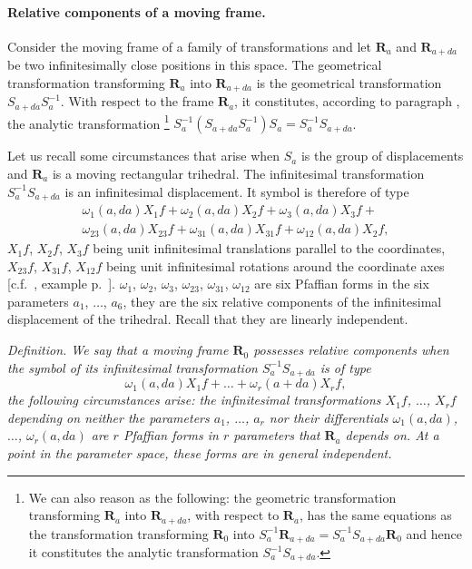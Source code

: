 \paragraph{Relative components of a moving frame.}
\label{sec:70}
Consider the moving frame of a family of transformations and let $\mathbf{R}_{a}$ and $\mathbf{R}_{a+da}$ be two infinitesimally close positions in this space. The geometrical transformation transforming $\mathbf{R}_{a}$ into $\mathbf{R}_{a+da}$ is the geometrical transformation $S_{a+da}S^{-1}_{a}$. With respect to the frame $\mathbf{R}_{a}$, it constitutes, according to paragraph , the analytic transformation \footnote{We can also reason as the following: the geometric transformation transforming $\mathbf{R}_{a}$ into $\mathbf{R}_{a+da}$, with respect to $\mathbf{R}_{a}$, has the same equations as the transformation transforming $\mathbf{R}_{0}$ into $S_{a}^{-1}\mathbf{R}_{a+da}=S_{a}^{-1}S_{a+da}\mathbf{R}_{0}$ and hence it constitutes the analytic transformation $S_{a}^{-1}S_{a+da}$.} $S_{a}^{-1}(S_{a+da}S_{a}^{-1})S_{a}=S_{a}^{-1}S_{a+da}$.

Let us recall some circumstances that arise when $S_{a}$ is the group of displacements and $\mathbf{R}_{a}$ is a moving rectangular trihedral. The infinitesimal transformation $S_{a}^{-1}S_{a+da}$ is an infinitesimal displacement. It symbol is therefore of type
\begin{equation}
  \label{eq:5.11}
  \begin{multlined}    
    \omega_{1}(a,da)X_{1}f+\omega_{2}(a,da)X_{2}f+\omega_{3}(a,da)X_{3}f+\\
    \omega_{23}(a,da)X_{23}f+\omega_{31}(a,da)X_{31}f+\omega_{12}(a,da)X_{2}f,
  \end{multlined}
\end{equation}
$X_{1}f$, $X_{2}f$, $X_{3}f$ being unit infinitesimal translations parallel to the coordinates, $X_{23}f$, $X_{31}f$, $X_{12}f$ being unit infinitesimal rotations around the coordinate axes [c.f.~, example p.~\pageref{sec:68}]. $\omega_{1}$, $\omega_{2}$, $\omega_{3}$, $\omega_{23}$, $\omega_{31}$, $\omega_{12}$ are six Pfaffian forms in the six parameters $a_{1}$, $\dots$, $a_{6}$, they are the six relative components of the infinitesimal displacement of the trihedral. Recall that they are linearly independent.

\somespace

\emph{Definition. We say that a moving frame $\mathbf{R}_{0}$ possesses relative components when the symbol of its infinitesimal transformation $S_{a}^{-1}S_{a+da}$ is of type
  \begin{equation}
    \label{eq:5.12}
    \omega_{1}(a,da)X_{1}f+\dots+\omega_{r}(a+da)X_{r}f,
  \end{equation}
the following circumstances arise: the infinitesimal transformations $X_{1}f$, $\dots$, $X_{r}f$ depending on neither the parameters $a_{1}$, $\dots$, $a_{r}$ nor their differentials $\omega_{1}(a,da)$, $\dots$, $\omega_{r}(a,da)$ are $r$ Pfaffian forms in $r$ parameters that $\mathbf{R}_{a}$ depends on. At a point in the parameter space, these forms are in general independent.}

